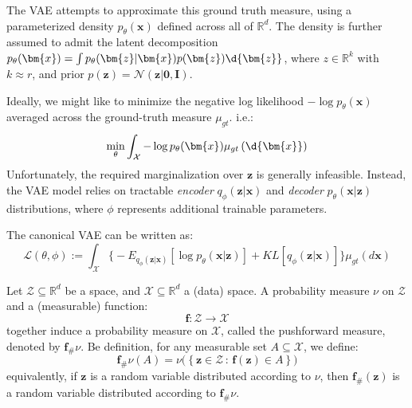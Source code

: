 \documentclass{article}
\begin{document}
The VAE attempts to approximate this ground truth measure, using a parameterized density $p_{\theta}(\bm{x})$ defined across all of $\mathbb{R}^{d}$.
The density is further assumed to admit the latent decomposition $p_{\theta}(\bm{x}) = \int p_{\theta}(\bm{z} | \bm{x}) p(\bm{z}) \d{\bm{z}}$, where $z \in \mathbb{R}^{k}$ with $k \approx r$, and prior $p(\bm{z}) = \mathcal{N}(\bm{z} | \bm{0}, \bm{I})$. 

Ideally, we might like to minimize the negative log likelihood $- \log p_{\theta}(\bm{x})$ averaged across the ground-truth measure $\mu_{gt}$. i.e.:
\[
  \min_{\theta} \int_{\mathcal{X}} - \log p_{\theta}(\bm{x}) \mu_{gt} \left( \d{\bm{x}} \right)
\]
Unfortunately, the required marginalization over $\bm{z}$ is generally infeasible. Instead, the VAE model relies on tractable \textit{encoder} $q_{\phi}(\bm{z} | \bm{x})$ and \textit{decoder} $p_{\theta}(\bm{x} | \bm{z})$ distributions, where $\phi$ represents additional trainable parameters. 

The canonical VAE can be written as:
\[
  \mathcal{L}(\theta, \phi) := \int_{\mathcal{X}} \Big\{ - E_{q_{\phi}(\bm{z} | \bm{x})} \left[ \log p_{\theta}(\bm{x} | \bm{z}) \right] + KL[q_{\phi}(\bm{z} | \bm{x})] \Big\} \mu_{gt}(d \bm{x}) 
\] 

\begin{definition}  Let $\mathcal{Z} \subseteq \mathbb{R}^{d}$ be a space, and $\mathcal{X} \subseteq \mathbb{R}^{d}$ a (data) space. A probability measure $\nu$ on $\mathcal{Z}$ and a (measurable) function:
  \[
    \bm{f}: \mathcal{Z} \to \mathcal{X}
  \]
  together induce a probability measure on $\mathcal{X}$, called the pushforward measure, denoted by $\bm{f}_{\#} \nu$. Be definition, for any measurable set $A \subseteq \mathcal{X}$, we define:
\[
  \bm{f}_{\#} \nu(A) = \nu \Big( \left\{ \bm{z} \in \mathcal{Z} \, : \, \bm{f}(\bm{z}) \in A  \right\}\Big)
\]
  equivalently, if $\bm{z}$ is a random variable distributed according to $\nu$, then $\bm{f}_{\#}(\bm{z})$ is a random variable distributed according to $\bm{f}_{\#} \nu$. 
\end{definition}
\end{document}
